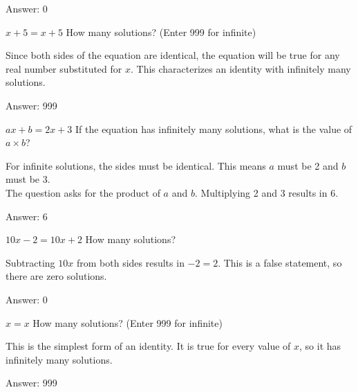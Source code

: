 \documentclass[11pt,paper=a4,answers]{exam}
\begin{document}
\begin{questions}
\begin{solution}
\vspace{20pt}
Answer: \colorbox{yellow!100}{0}
\end{solution}
\question
$x + 5 = x + 5$
How many solutions? (Enter 999 for infinite)

\begin{solution}
Since both sides of the equation are identical, the equation will be true for any real number substituted for $x$. This characterizes an identity with infinitely many solutions.

\vspace{20pt}
Answer: \colorbox{yellow!100}{999}
\end{solution}

\question
$ax + b = 2x + 3$
If the equation has infinitely many solutions, what is the value of $a \times b$?

\begin{solution}
For infinite solutions, the sides must be identical. This means $a$ must be 2 and $b$ must be 3. 
\\[10pt]
The question asks for the product of $a$ and $b$. Multiplying 2 and 3 results in 6.

\vspace{20pt}
Answer: \colorbox{yellow!100}{6}
\end{solution}

\question
$10x - 2 = 10x + 2$
How many solutions?

\begin{solution}
Subtracting $10x$ from both sides results in $-2 = 2$. This is a false statement, so there are zero solutions.

\vspace{20pt}
Answer: \colorbox{yellow!100}{0}
\end{solution}

\question
$x = x$
How many solutions? (Enter 999 for infinite)

\begin{solution}
This is the simplest form of an identity. It is true for every value of $x$, so it has infinitely many solutions.

\vspace{20pt}
Answer: \colorbox{yellow!100}{999}
\end{solution}


\end{questions}
\end{document}
